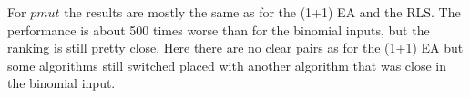 For $pmut$ the results are mostly the same as for the (1+1) EA and the RLS.
The performance is about 500 times worse than for the binomial inputs, but the ranking is still pretty close.
Here there are no clear pairs as for the (1+1) EA but some algorithms still switched placed with another algorithm that was close in the binomial input.